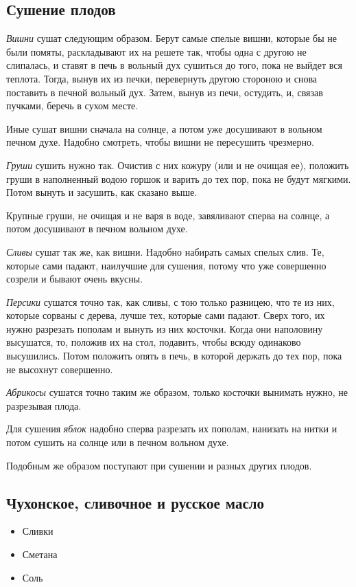 \subsection{Сушение плодов}

\emph{Вишни} сушат следующим образом. Берут самые спелые вишни, которые бы не были помяты, раскладывают их на решете так, чтобы одна с другою не слипалась, и ставят в печь в вольный дух сушиться до того, пока не выйдет вся теплота. Тогда, вынув их из печки, перевернуть другою стороною и снова поставить в печной вольный дух. Затем, вынув из печи, остудить, и, связав пучками, беречь в сухом месте.

Иные сушат вишни сначала на солнце, а потом уже досушивают в вольном печном духе. Надобно смотреть, чтобы вишни не пересушить чрезмерно.

\emph{Груши} сушить нужно так. Очистив с них кожуру (или и не очищая ее), положить груши в наполненный водою горшок и варить до тех пор, пока не будут мягкими. Потом вынуть и засушить, как сказано выше.

Крупные груши, не очищая и не варя в воде, завяливают сперва на солнце, а потом досушивают в печном вольном духе.

\emph{Сливы} сушат так же, как вишни. Надобно набирать самых спелых слив. Те, которые сами падают, наилучшие для сушения, потому что уже совершенно созрели и бывают очень вкусны.

\emph{Персики} сушатся точно так, как сливы, с тою только разницею, что те из них, которые сорваны с дерева, лучше тех, которые сами падают. Сверх того, их нужно разрезать пополам и вынуть из них косточки. Когда они наполовину высушатся, то, положив их на стол, подавить, чтобы всюду одинаково высушились. Потом положить опять в печь, в которой держать до тех пор, пока не высохнут совершенно.

\emph{Абрикосы} сушатся точно таким же образом, только косточки вынимать нужно, не разрезывая плода.

Для сушения \emph{яблок} надобно сперва разрезать их пополам, нанизать на нитки и потом сушить на солнце или в печном вольном духе.

Подобным же образом поступают при сушении и разных других плодов.

\subsection{Чухонское, сливочное и русское масло}

\begin{itemize}
	\item Сливки 
    \item Сметана 
    \item Соль
\end{itemize}

